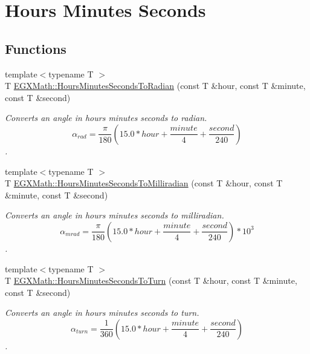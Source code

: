 \hypertarget{group___e_g_x_math-_angle_conversions-_hours_minutes_seconds}{}\section{Hours Minutes Seconds}
\label{group___e_g_x_math-_angle_conversions-_hours_minutes_seconds}
\subsection*{Functions}
\begin{DoxyCompactItemize}
\item 
{\footnotesize template$<$typename T $>$ }\\T \mbox{\hyperlink{group___e_g_x_math-_angle_conversions-_hours_minutes_seconds_gaa0b04e9012ec739df1464298971e3be7}{E\+G\+X\+Math\+::\+Hours\+Minutes\+Seconds\+To\+Radian}} (const T \&hour, const T \&minute, const T \&second)
\begin{DoxyCompactList}\small\item\em Converts an angle in hours minutes seconds to radian. \[\alpha_{rad}=\frac{\pi}{180}(15.0 * hour + \frac{minute}{4} + \frac{second}{240})\]. \end{DoxyCompactList}\item 
{\footnotesize template$<$typename T $>$ }\\T \mbox{\hyperlink{group___e_g_x_math-_angle_conversions-_hours_minutes_seconds_gad78a90abaed52ca9d5fe6b4287c4a5f3}{E\+G\+X\+Math\+::\+Hours\+Minutes\+Seconds\+To\+Milliradian}} (const T \&hour, const T \&minute, const T \&second)
\begin{DoxyCompactList}\small\item\em Converts an angle in hours minutes seconds to milliradian. \[\alpha_{mrad}=\frac{\pi}{180}(15.0 * hour + \frac{minute}{4} + \frac{second}{240})*10^3\]. \end{DoxyCompactList}\item 
{\footnotesize template$<$typename T $>$ }\\T \mbox{\hyperlink{group___e_g_x_math-_angle_conversions-_hours_minutes_seconds_ga68050282994968cd6f80a396f6a539ae}{E\+G\+X\+Math\+::\+Hours\+Minutes\+Seconds\+To\+Turn}} (const T \&hour, const T \&minute, const T \&second)
\begin{DoxyCompactList}\small\item\em Converts an angle in hours minutes seconds to turn. \[\alpha_{turn}=\frac{1}{360}(15.0 * hour + \frac{minute}{4} + \frac{second}{240})\]. \end{DoxyCompactList}\item 

\end{DoxyCompactItemize}
